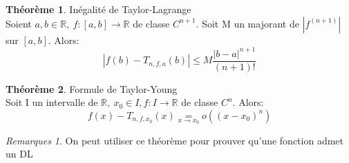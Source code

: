\documentclass[fleqn]{article}
\theoremstyle{definition} \newtheorem*{defi}{D\'efinition}
\theoremstyle{definition} \newtheorem*{theo}{Th\'eor\`eme}
\theoremstyle{remark} \newtheorem*{rqs}{Remarques}
\theoremstyle{definition} \newtheorem*{prop}{Propri\'et\'e}
\begin{document}
\begin{theo} In\'egalit\'e de Taylor-Lagrange\\
	Soient $a,b \in \mathbb{R},\ f:[a,b] \rightarrow \mathbb{R}$ de classe $C^{n+1}$. Soit M un majorant de $|f^{(n+1)}|$ sur $[a,b]$. Alors:
	\[|f(b) - T_{n,f,a}(b)| \leq M\frac{|b-a|^{n+1}}{(n+1)!}\]
\end{theo}

\begin{theo} Formule de Taylor-Young\\
	Soit I un intervalle de $\mathbb{R},\ x_0 \in I, f:I\rightarrow \mathbb{R}$ de classe $C^n$. Alors:
	\[f(x) - T_{n,f,x_0}(x) \underset{x \rightarrow x_0}{=} o((x-x_0)^n)\]

	\begin{rqs}
		On peut utiliser ce th\'eor\`eme pour prouver qu'une fonction admet un DL
	\end{rqs}
\end{theo}
\end{document}
